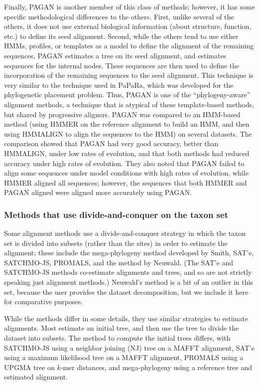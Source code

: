 Finally, PAGAN is another member of this class of methods; however, it has
some specific methodological differences to the others. First, unlike several of the others,
it does not use external biological information (about structure, function, etc.) to define
its seed alignment. Second, while the others tend to use either HMMs, profiles, or 
templates as a model to define the alignment of the remaining sequences, PAGAN estimates
a tree on its seed alignment, and estimates sequences for the internal nodes. These 
sequences are then used to define the incorporation of the remaining sequences to the seed
alignment. This technique is very similar to the technique used in PaPaRa, which
was developed for the phylogenetic placement problem. Thus, PAGAN
is one of the ``phylogeny-aware'' alignment methods, a technique that is atypical of these
template-based methods, but shared by progressive aligners. PAGAN was compared to an
HMM-based method (using HMMER on the reference alignment to build an HMM, and
then using HMMALIGN to align the sequences to the HMM) on several datasets.
The comparison showed that PAGAN had very good accuracy, better than HMMALIGN,
under low rates of evolution, and that both methods had reduced accuracy under high
rates of evolution. They also noted that PAGAN failed to align some sequences under
model conditions with high rates of evolution, while HMMER aligned all sequences; 
however, the sequences that both HMMER and PAGAN aligned were aligned more accurately
using PAGAN.

\subsubsection{Methods that use divide-and-conquer on the taxon set}
Some alignment methods use a divide-and-conquer strategy in which the 
taxon set is divided into subsets
(rather than the sites) in order to estimate the alignment; these include the 
mega-phylogeny method developed by Smith, SAT'e, SATCHMO-JS,
PROMALS, and the method by Neuwald. (The SAT'e and SATCHMO-JS 
methods co-estimate alignments and trees, and so are not strictly speaking just alignment
methods.) Neuwald's method is a bit of an outlier in this set, because the user provides
the dataset decomposition, but we include it here for comparative purposes.

While the methods differ in some details, they use similar strategies to estimate 
alignments. Most estimate an initial tree, and then use the tree to divide the dataset into
subsets. The method to compute the initial trees differs, with SATCHMO-JS using a
neighbor joining (NJ) tree on a MAFFT alignment, SAT'e using a maximum 
likelihood tree on a MAFFT alignment, PROMALS using a UPGMA tree on $k$-mer distances,
and mega-phylogeny using a reference tree and estimated alignment.


